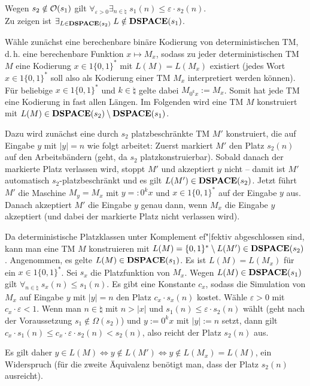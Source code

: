 \begin{Beweis}
    Wegen $s_2 \notin \mathcal{O}(s_1)$ gilt
    $\forall_{\varepsilon > 0} \exists_{n \in \natural}\; s_1(n) \le \varepsilon \cdot s_2(n)$.\\
    Zu zeigen ist $\exists_{L \in \mathbf{DSPACE}(s_2)}\; L \notin \mathbf{DSPACE}(s_1)$.

    Wähle zunächst eine berechenbare binäre Kodierung von deterministischen TM,
    d.\,h. eine berechenbare Funktion $x \mapsto M_x$, sodass zu jeder deterministischen TM $M$
    eine Kodierung $x \in 1\{0, 1\}^\ast$ mit $L(M) = L(M_x)$ existiert
    (jedes Wort $x \in 1\{0, 1\}^\ast$ soll also als Kodierung einer TM $M_x$ interpretiert werden
    können).
    Für beliebige $x \in 1\{0, 1\}^\ast$ und $k \in \natural$ gelte dabei
    $M_{0^k x} := M_x$.
    Somit hat jede TM eine Kodierung in fast allen Längen.
    Im Folgenden wird eine TM $M$ konstruiert mit $L(M) \in \mathbf{DSPACE}(s_2) \setminus \mathbf{DSPACE}(s_1)$.

    Dazu wird zunächst eine durch $s_2$ platzbeschränkte TM $M'$ konstruiert, die
    auf Eingabe $y$ mit $|y| = n$ wie folgt arbeitet:
    Zuerst markiert $M'$ den Platz $s_2(n)$ auf den Arbeitsbändern
    (geht, da $s_2$ platzkonstruierbar).
    Sobald danach der markierte Platz verlassen wird, stoppt $M'$ und akzeptiert $y$ nicht --
    damit ist $M'$ automatisch $s_2$-platzbeschränkt und es gilt $L(M') \in \mathbf{DSPACE}(s_2)$.
    Jetzt führt $M'$ die Maschine $M_y = M_x$ mit $y =: 0^k x$ und $x \in 1\{0, 1\}^\ast$
    auf der Eingabe $y$ aus.
    Danach akzeptiert $M'$ die Eingabe $y$ genau dann, wenn $M_x$ die Eingabe $y$ akzeptiert
    (und dabei der markierte Platz nicht verlassen wird).

    Da deterministische Platzklassen unter Komplement ef"|fektiv abgeschlossen sind,
    kann man eine TM $M$ konstruieren mit $L(M) = \{0, 1\}^\ast \setminus L(M') \in \mathbf{DSPACE}(s_2)$.
    Angenommen, es gelte $L(M) \in \mathbf{DSPACE}(s_1)$.
    Es ist $L(M) = L(M_x)$ für ein $x \in 1\{0, 1\}^\ast$.
    Sei $s_x$ die Platzfunktion von $M_x$.
    Wegen $L(M) \in \mathbf{DSPACE}(s_1)$ gilt $\forall_{n \in \natural}\; s_x(n) \le s_1(n)$.
    Es gibt eine Konstante $c_x$, sodass die Simulation von $M_x$ auf Eingabe $y$ mit $|y| = n$
    den Platz $c_x \cdot s_x(n)$ kostet.
    Wähle $\varepsilon > 0$ mit $c_x \cdot \varepsilon < 1$.
    Wenn man $n \in \natural$ mit $n > |x|$ und $s_1(n) \le \varepsilon \cdot s_2(n)$ wählt
    (geht nach der Voraussetzung $s_1 \notin \Omega(s_2)$)
    und $y := 0^k x$ mit $|y| := n$ setzt,
    dann gilt $c_x \cdot s_1(n) \le c_x \cdot \varepsilon \cdot s_2(n) < s_2(n)$,
    also reicht der Platz $s_2(n)$ aus.

    Es gilt daher $y \in L(M) \iff y \notin L(M') \iff y \notin L(M_x) = L(M)$, ein Widerspruch
    (für die zweite Äquivalenz benötigt man, dass der Platz $s_2(n)$ ausreicht).
\end{Beweis}

